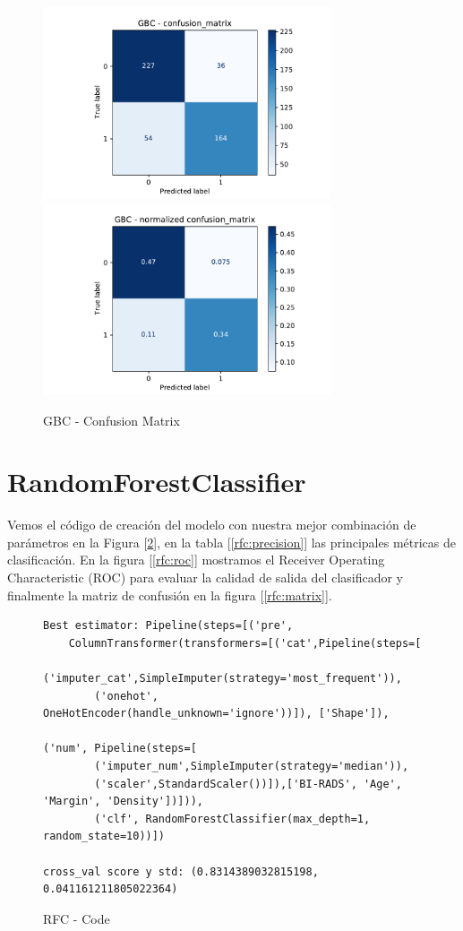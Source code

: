 \documentclass[12pt,twoside]{report}
\begin{document}
\begin{figure}[htp]
\begin{multicols}{2}
\includegraphics[width=8.5cm]{./code/figures_python/confusion_matrix/gbc.pdf}%
\columnbreak
\includegraphics[width=8.5cm]{./code/figures_python/confusion_matrix/gbc_normalized.pdf}%
\end{multicols}
 \caption{GBC - Confusion Matrix}
  \label{gbc:matrix}
 \end{figure}

\section*{RandomForestClassifier}

Vemos el código de creación del modelo con nuestra mejor combinación de parámetros en la Figura [\ref{rfc:code}], en la tabla [\ref{rfc:precision}] las principales métricas de clasificación. En la figura [\ref{rfc:roc}] mostramos el Receiver Operating Characteristic (ROC) para evaluar la calidad de salida del clasificador y finalmente la matriz de confusión en la figura [\ref{rfc:matrix}].

\begin{figure}[ht]
 \begin{lstlisting}
Best estimator: Pipeline(steps=[('pre',
	ColumnTransformer(transformers=[('cat',Pipeline(steps=[
		('imputer_cat',SimpleImputer(strategy='most_frequent')),
		('onehot', OneHotEncoder(handle_unknown='ignore'))]), ['Shape']),
														('num', Pipeline(steps=[
		('imputer_num',SimpleImputer(strategy='median')),
		('scaler',StandardScaler())]),['BI-RADS', 'Age', 'Margin', 'Density'])])),
		('clf', RandomForestClassifier(max_depth=1, random_state=10))])
                
cross_val score y std: (0.8314389032815198, 0.041161211805022364)
 \end{lstlisting}
 \caption{RFC - Code}
 \label{rfc:code}
 \end{figure}
\end{document}
